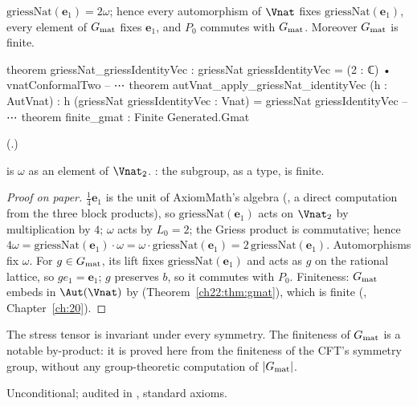 \begin{theorem}\label{ch22:thm:omega}
$\mathrm{griessNat}(\mathbf{e}_1)=2\omega$; hence every automorphism of $\Vnat$ fixes $\mathrm{griessNat}(\mathbf{e}_1)$, every element of
$G_{\mathrm{mat}}$ fixes $\mathbf{e}_1$, and $P_0$ commutes with $G_{\mathrm{mat}}$.  Moreover $G_{\mathrm{mat}}$ is finite.
\end{theorem}
\begin{leancode}
theorem griessNat_griessIdentityVec :
    griessNat griessIdentityVec = (2 : ℂ) • vnatConformalTwo
-- ⋯
theorem autVnat_apply_griessNat_identityVec (h : AutVnat) :
    h (griessNat griessIdentityVec : Vnat) = griessNat griessIdentityVec
-- ⋯
theorem finite_gmat : Finite Generated.Gmat
\end{leancode}
(.)
\begin{dictionary}
 is $\omega$ as an element of $\Vnat_2$.  : the subgroup, as a type, is
finite.
\end{dictionary}
\begin{proof}[Proof on paper]
$\frac14\mathbf{e}_1$ is the unit of AxiomMath's algebra (, a direct computation from the three block products),
so $\mathrm{griessNat}(\mathbf{e}_1)$ acts on $\Vnat_2$ by multiplication by $4$; $\omega$ acts by $L_0=2$; the Griess product is
commutative; hence $4\omega=\mathrm{griessNat}(\mathbf{e}_1)\cdot\omega=\omega\cdot\mathrm{griessNat}(\mathbf{e}_1)=2\,\mathrm{griessNat}(\mathbf{e}_1)$.
Automorphisms fix $\omega$.  For $g\in G_{\mathrm{mat}}$, its lift fixes $\mathrm{griessNat}(\mathbf{e}_1)$ and acts as $g$ on the
rational lattice, so $ge_1=\mathbf{e}_1$; $g$ preserves $b$, so it commutes with $P_0$.  Finiteness: $G_{\mathrm{mat}}$ embeds in
$\Aut(\Vnat)$ by  (Theorem~\ref{ch22:thm:gmat}), which is finite (, Chapter~\ref{ch:20}).
\end{proof}
\begin{physics}
The stress tensor is invariant under every symmetry.  The finiteness of $G_{\mathrm{mat}}$ is a notable by-product: it is proved
here from the finiteness of the CFT's symmetry group, without any group-theoretic computation of $|G_{\mathrm{mat}}|$.
\end{physics}
\begin{status}Unconditional; audited in , standard axioms.\end{status}

